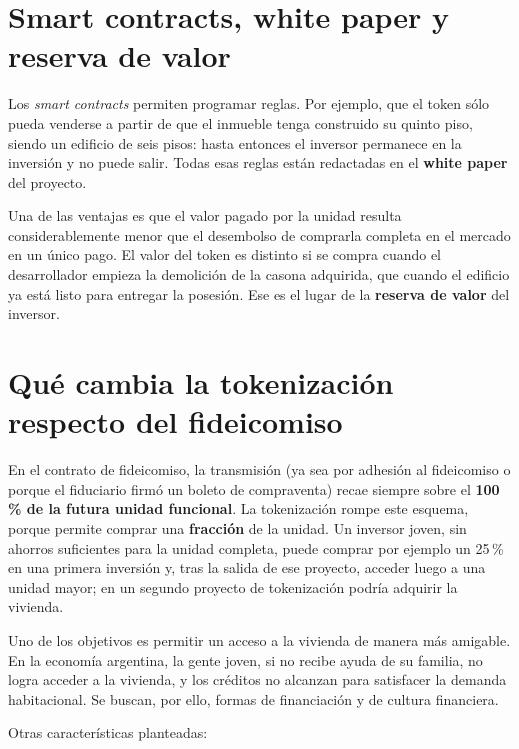 \documentclass[12pt,oneside]{book}
\begin{document}
\section{Smart contracts, white paper y reserva de valor}

Los \textit{smart contracts} permiten programar reglas. Por ejemplo, que el token sólo pueda venderse a partir de que el inmueble tenga construido su quinto piso, siendo un edificio de seis pisos: hasta entonces el inversor permanece en la inversión y no puede salir. Todas esas reglas están redactadas en el \textbf{white paper} del proyecto.

Una de las ventajas es que el valor pagado por la unidad resulta considerablemente menor que el desembolso de comprarla completa en el mercado en un único pago. El valor del token es distinto si se compra cuando el desarrollador empieza la demolición de la casona adquirida, que cuando el edificio ya está listo para entregar la posesión. Ese es el lugar de la \textbf{reserva de valor} del inversor.

\section{Qué cambia la tokenización respecto del fideicomiso}

En el contrato de fideicomiso, la transmisión (ya sea por adhesión al fideicomiso o porque el fiduciario firmó un boleto de compraventa) recae siempre sobre el \textbf{100\,\% de la futura unidad funcional}. La tokenización rompe este esquema, porque permite comprar una \textbf{fracción} de la unidad. Un inversor joven, sin ahorros suficientes para la unidad completa, puede comprar por ejemplo un 25\,\% en una primera inversión y, tras la salida de ese proyecto, acceder luego a una unidad mayor; en un segundo proyecto de tokenización podría adquirir la vivienda.

Uno de los objetivos es permitir un acceso a la vivienda de manera más amigable. En la economía argentina, la gente joven, si no recibe ayuda de su familia, no logra acceder a la vivienda, y los créditos no alcanzan para satisfacer la demanda habitacional. Se buscan, por ello, formas de financiación y de cultura financiera.

Otras características planteadas:
\end{document}

